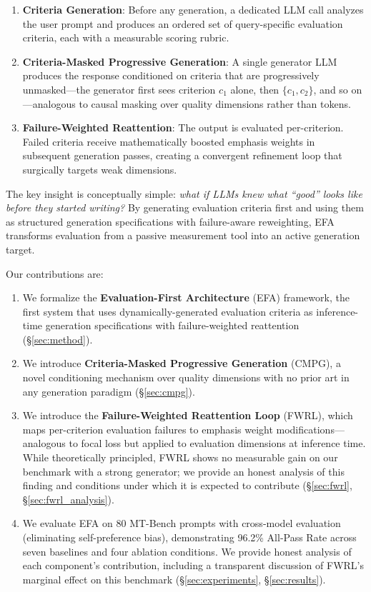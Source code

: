 \documentclass[11pt]{article}
\newcommand{\efa}{\textsc{EFA}}  %
\newcommand{\cmpg}{\textsc{CMPG}}
\newcommand{\fwrl}{\textsc{FWRL}}
\begin{document}
\begin{enumerate}[leftmargin=*]
    \item \textbf{Criteria Generation}: Before any generation, a dedicated LLM call analyzes the user prompt and produces an ordered set of query-specific evaluation criteria, each with a measurable scoring rubric.
    \item \textbf{Criteria-Masked Progressive Generation}: A single generator LLM produces the response conditioned on criteria that are progressively unmasked---the generator first sees criterion $c_1$ alone, then $\{c_1, c_2\}$, and so on---analogous to causal masking over quality dimensions rather than tokens.
    \item \textbf{Failure-Weighted Reattention}: The output is evaluated per-criterion. Failed criteria receive mathematically boosted emphasis weights in subsequent generation passes, creating a convergent refinement loop that surgically targets weak dimensions.
\end{enumerate}

The key insight is conceptually simple: \emph{what if LLMs knew what ``good'' looks like before they started writing?} By generating evaluation criteria first and using them as structured generation specifications with failure-aware reweighting, \efa{} transforms evaluation from a passive measurement tool into an active generation target.

Our contributions are:
\begin{enumerate}[leftmargin=*]
    \item We formalize the \textbf{Evaluation-First Architecture} (\efa{}) framework, the first system that uses dynamically-generated evaluation criteria as inference-time generation specifications with failure-weighted reattention (\S\ref{sec:method}).
    \item We introduce \textbf{Criteria-Masked Progressive Generation} (\cmpg{}), a novel conditioning mechanism over quality dimensions with no prior art in any generation paradigm (\S\ref{sec:cmpg}).
    \item We introduce the \textbf{Failure-Weighted Reattention Loop} (\fwrl{}), which maps per-criterion evaluation failures to emphasis weight modifications---analogous to focal loss \citep{lin2017focal} but applied to evaluation dimensions at inference time. While theoretically principled, \fwrl{} shows no measurable gain on our benchmark with a strong generator; we provide an honest analysis of this finding and conditions under which it is expected to contribute (\S\ref{sec:fwrl}, \S\ref{sec:fwrl_analysis}).
    \item We evaluate \efa{} on 80 MT-Bench prompts with cross-model evaluation (eliminating self-preference bias), demonstrating 96.2\% All-Pass Rate across seven baselines and four ablation conditions. We provide honest analysis of each component's contribution, including a transparent discussion of \fwrl{}'s marginal effect on this benchmark (\S\ref{sec:experiments}, \S\ref{sec:results}).
\end{enumerate}
\end{document}
